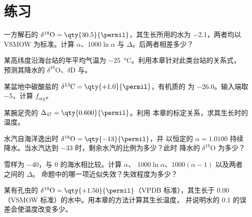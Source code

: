 \section{练习}

\begin{exercise}[$\star$]\label{exo:b3:stable-isotopes:1}
一方解石的 $\delta^{18}\mathrm O = \qty{30.5}{\permil}$，其生长所用的水为
\qty{-2.1}{\permil}，两者均以 VSMOW 为标准。计算 $\alpha$、$1000\ln\alpha$ 与
$\Delta$。后两者相差多少？
\end{exercise}

\begin{exercise}[$\star$]\label{exo:b3:stable-isotopes:2}
某高纬度沿海台站的年平均气温为
\qty{-25}{\celsius}。利用本章针对此类台站的关系式，
预测其降水的
$\delta^{18}\mathrm O$、$\delta\mathrm D$ 与。
\end{exercise}

\begin{exercise}[$\star$]\label{exo:b3:stable-isotopes:3}
某盆地中碳酸盐的 $\delta^{13}\mathrm C = \qty{+1.0}{\permil}$，有机质的
为 \qty{-26.0}{\permil}。输入端取 \qty{-5}{\permil}，计算
$f_{\mathrm{org}}$。
\end{exercise}

\begin{exercise}[$\star$]\label{exo:b3:stable-isotopes:4}
某腕足壳的 $\Delta_{47} = \qty{0.600}{\permil}$。利用
本章的标定关系，求其生长时的温度。
\end{exercise}

\begin{exercise}[$\star\star$]\label{exo:b3:stable-isotopes:5}
水汽自海洋逸出时 $\delta^{18}\mathrm O = \qty{-13}{\permil}$，并
以恒定的 $\alpha = 1.0100$ 持续降水。当水汽达到
\qty{-33}{\permil} 时，剩余水汽的比例为多少？此时
降水的 $\delta^{18}\mathrm O$ 为多少？
\end{exercise}

\begin{exercise}[$\star\star$]\label{exo:b3:stable-isotopes:6}
雪样为 \qty{-40}{\permil}，与 \qty{0}{\permil} 的海水相比较。计算 $\alpha$、
$1000\ln\alpha$、$1000(\alpha - 1)$ 以及两者之间的 $\Delta$。
命题中的哪一项近似失效？失效程度为多少？
\end{exercise}

\begin{exercise}[$\star\star$]\label{exo:b3:stable-isotopes:7}
某有孔虫的 $\delta^{18}\mathrm O = \qty{+1.50}{\permil}$（VPDB 标准），其生长于
\qty{0.00}{\permil}（VSMOW 标准）的水中。用本章的方法计算其生长温度，
并说明水的
\qty{0.1}{\permil} 的误差会使温度改变多少。
\end{exercise}

